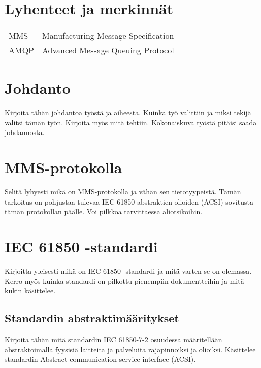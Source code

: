 \documentclass[globalnumbering,centeredcaptions,draftfooter]{tutthesis} %
\begin{document}
\chapter*{Lyhenteet ja merkinnät}

\begin{tabular}[h]{@{} p{} p{} @{}}
MMS & Manufacturing Message Specification \\
AMQP & Advanced Message Queuing Protocol \\
\end{tabular}


\chapter{Johdanto}
\label{ch:johdanto}
Kirjoita tähän johdantoa työstä ja aiheesta. Kuinka työ valittiin ja miksi tekijä valitsi tämän työn. Kirjoita myös mitä tehtiin. Kokonaiskuva työstä pitäisi saada johdannosta.


\chapter{MMS-protokolla}
\label{ch:mms-protokolla}
Selitä lyhyesti mikä on MMS-protokolla ja vähän sen tietotyypeistä. Tämän tarkoitus on pohjustaa tulevaa IEC 61850 abstraktien olioiden (ACSI) sovitusta tämän protokollan päälle. Voi pilkkoa tarvittaessa aliotsikoihin.


\chapter{IEC 61850 -standardi}
\label{ch:iec 61850 -standardi}
Kirjoitta yleisesti mikä on IEC 61850 -standardi ja mitä varten se on olemassa. Kerro myös kuinka standardi on pilkottu pienempiin dokumentteihin ja mitä kukin käsittelee.

\section{Standardin abstraktimääritykset}
Kirjoita tähän mitä standardin IEC 61850-7-2 osuudessa määritellään abstraktoimalla fyysisiä laitteita ja palveluita rajapinnoiksi ja olioiksi. Käsittelee standardin Abstract communication service interface (ACSI).
\end{document}
